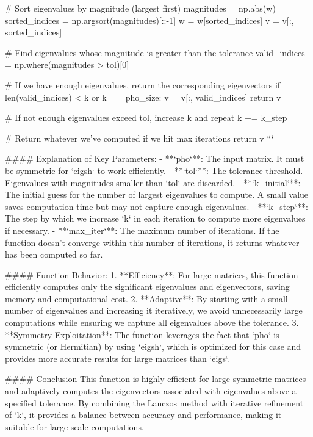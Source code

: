         # Sort eigenvalues by magnitude (largest first)
        magnitudes = np.abs(w)
        sorted_indices = np.argsort(magnitudes)[::-1]
        w = w[sorted_indices]
        v = v[:, sorted_indices]
        
        # Find eigenvalues whose magnitude is greater than the tolerance
        valid_indices = np.where(magnitudes > tol)[0]
        
        # If we have enough eigenvalues, return the corresponding eigenvectors
        if len(valid_indices) < k or k == pho_size:
            v = v[:, valid_indices]
            return v
        
        # If not enough eigenvalues exceed tol, increase k and repeat
        k += k_step
    
    # Return whatever we've computed if we hit max iterations
    return v
```

#### Explanation of Key Parameters:
- **`pho`**: The input matrix. It must be symmetric for `eigsh` to work efficiently.
- **`tol`**: The tolerance threshold. Eigenvalues with magnitudes smaller than `tol` are discarded.
- **`k_initial`**: The initial guess for the number of largest eigenvalues to compute. A small value saves computation time but may not capture enough eigenvalues.
- **`k_step`**: The step by which we increase `k` in each iteration to compute more eigenvalues if necessary.
- **`max_iter`**: The maximum number of iterations. If the function doesn't converge within this number of iterations, it returns whatever has been computed so far.

#### Function Behavior:
1. **Efficiency**: For large matrices, this function efficiently computes only the significant eigenvalues and eigenvectors, saving memory and computational cost.
2. **Adaptive**: By starting with a small number of eigenvalues and increasing it iteratively, we avoid unnecessarily large computations while ensuring we capture all eigenvalues above the tolerance.
3. **Symmetry Exploitation**: The function leverages the fact that `pho` is symmetric (or Hermitian) by using `eigsh`, which is optimized for this case and provides more accurate results for large matrices than `eigs`.

#### Conclusion
This function is highly efficient for large symmetric matrices and adaptively computes the eigenvectors associated with eigenvalues above a specified tolerance. By combining the Lanczos method with iterative refinement of `k`, it provides a balance between accuracy and performance, making it suitable for large-scale computations.